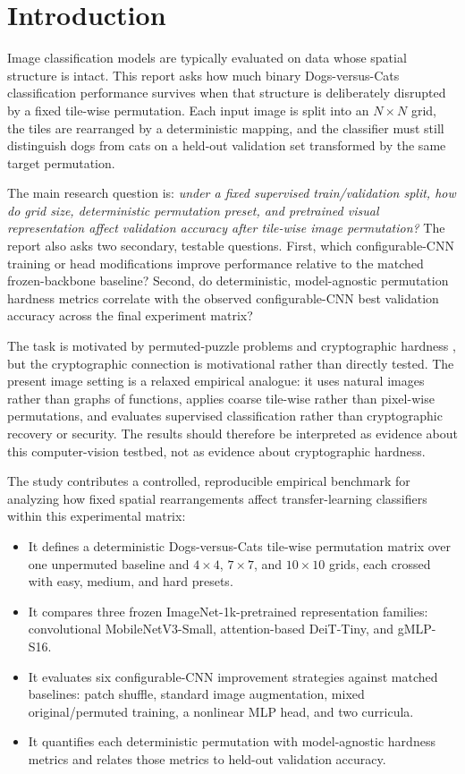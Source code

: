 \documentclass[12pt]{article}
\begin{document}
\clearpage
\twocolumn

\section{Introduction}

Image classification models are typically evaluated on data whose spatial structure is intact. This report asks how much binary Dogs-versus-Cats classification performance survives when that structure is deliberately disrupted by a fixed tile-wise permutation. Each input image is split into an $N \times N$ grid, the tiles are rearranged by a deterministic mapping, and the classifier must still distinguish dogs from cats on a held-out validation set transformed by the same target permutation.

The main research question is: \emph{under a fixed supervised train/validation split, how do grid size, deterministic permutation preset, and pretrained visual representation affect validation accuracy after tile-wise image permutation?} The report also asks two secondary, testable questions. First, which configurable-CNN training or head modifications improve performance relative to the matched frozen-backbone baseline? Second, do deterministic, model-agnostic permutation hardness metrics correlate with the observed configurable-CNN best validation accuracy across the final experiment matrix?

The task is motivated by permuted-puzzle problems and cryptographic hardness \citep{boyle2019permuted}, but the cryptographic connection is motivational rather than directly tested. The present image setting is a relaxed empirical analogue: it uses natural images rather than graphs of functions, applies coarse tile-wise rather than pixel-wise permutations, and evaluates supervised classification rather than cryptographic recovery or security. The results should therefore be interpreted as evidence about this computer-vision testbed, not as evidence about cryptographic hardness.

The study contributes a controlled, reproducible empirical benchmark for analyzing how fixed spatial rearrangements affect transfer-learning classifiers within this experimental matrix:
\begin{itemize}
  \item It defines a deterministic Dogs-versus-Cats tile-wise permutation matrix over one unpermuted baseline and $4 \times 4$, $7 \times 7$, and $10 \times 10$ grids, each crossed with easy, medium, and hard presets.
  \item It compares three frozen ImageNet-1k-pretrained representation families: convolutional MobileNetV3-Small, attention-based DeiT-Tiny, and gMLP-S16.
  \item It evaluates six configurable-CNN improvement strategies against matched baselines: patch shuffle, standard image augmentation, mixed original/permuted training, a nonlinear MLP head, and two curricula.
  \item It quantifies each deterministic permutation with model-agnostic hardness metrics and relates those metrics to held-out validation accuracy.
\end{itemize}
\end{document}
